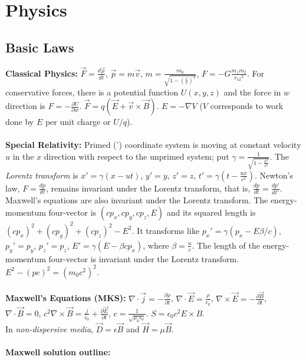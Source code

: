 \chapter{Physics}
\section{Basic Laws}
{\bf Classical Physics:}
${\vec F}= {\frac {d{\vec p}} {dt}}$, 
${\vec p}= m{\vec v}$,
$m= {\frac {m_{0}} {\sqrt {1 - ({\frac {v}{c}})^{2}}}}$,
$F= -G {\frac {m_{1} m_{2} } {{r_{12} }^{2} }}$.  For conservative
forces, there is a potential function $U(x,y,z)$ and the force in $w$ direction is
$F= - {\frac {\partial U} {\partial w}}$.
${\vec F}= q ( {\vec E} + {\vec v} \times {\vec B} )$.  $E= - \nabla V$ ($V$ corresponds
to work done by $E$ per unit charge or $U/q$).
\\
\\
{\bf Special Relativity:}
Primed (') coordinate system is moving at constant velocity $u$ in the $x$ 
direction with respect to the unprimed system; put $\gamma= {\frac 1
{\sqrt {1-{\frac {u^2} {c^2}}}}}$. The \emph{Lorentz transform} is
$x'= \gamma (x-ut)$,
$y'= y$, $z'= z$, $t'= \gamma (t-{\frac {ux} {c^2}})$. Newton's law, $F= {\frac {dp} {dt}}$, 
remains invariant under the Lorentz transform, that is,
${\frac {dp} {dt}}= {\frac {dp'} {dt'}}$.
Maxwell's equations are also invariant under
the Lorentz transform.
The energy-momentum four-vector is
$(cp_x, cp_y, cp_z, E) $ and its squared
length is $(cp_x)^2+(cp_y)^2+(cp_z)^2-E^2$.  It transforms like
$p_x'= \gamma (p_x-E \beta/c)$,
$p_y'= p_y$,
$p_z'= p_z$,
$E'= \gamma (E-\beta c p_x)$, where $\beta= {\frac {u} {c}}$.
The length of the energy-momentum four-vector
is invariant under the Lorentz transform.
$E^{2} - (p c)^{2} = { (m_0 c^{2} ) }^{2}$.
\\
\\
{\bf Maxwell's Equations (MKS):}
$\nabla \cdot {\vec j} = - {\frac {\partial \rho} {\partial t}}$,
$\nabla \cdot {\vec E} = {\frac {\rho} {\epsilon_{0}}}$,
$\nabla \times {\vec E} = - {\frac {\partial {\vec B}}{\partial t}}$,
$\nabla \cdot {\vec B} = 0$,
${c^{2}} \nabla \times {\vec B} = {\frac {j} {\epsilon_{0}}} +
{\frac {\partial {\vec E}} {\partial t}}$, $c= {\frac 1 {\sqrt { \mu_0 \epsilon_0}}}$.
$S= \epsilon_0 c^2 E \times B$.
\\
In \emph{non-dispersive media}, ${\vec D} = \epsilon {\vec B} $ and ${\vec H} = \mu {\vec B}$.
\\
\\
{\bf Maxwell solution outline:} 
